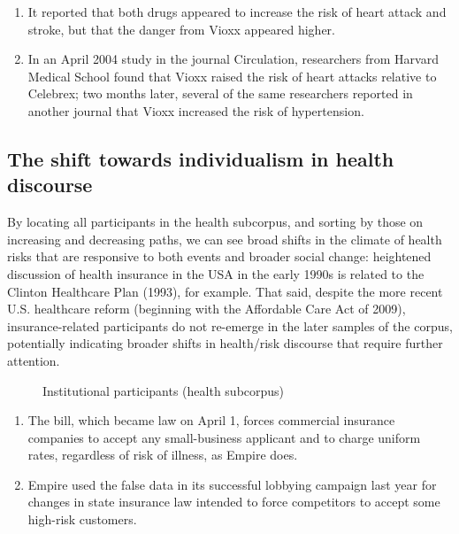 \begin{enumerate} [before=\color{black}\ttfamily] \setlength\itemsep{0em} \small
\item It reported that both drugs appeared to increase the risk of heart attack and stroke, but that the danger from Vioxx appeared higher.
\item In an April 2004 study in the journal Circulation, researchers from Harvard Medical School found that Vioxx raised the risk of heart attacks relative to Celebrex; two months later, several of the same researchers reported in another journal that Vioxx increased the risk of hypertension.
\end{enumerate}

\subsection{The shift towards individualism in health discourse}

By locating all participants in the health subcorpus, and sorting by those on increasing and decreasing paths, we can see broad shifts in the climate of health risks that are responsive to both events and broader social change: heightened discussion of health insurance in the USA in the early 1990s is related to the Clinton Healthcare Plan (1993), for example. That said, despite the more recent U.S. healthcare reform (beginning with the Affordable Care Act of 2009), insurance-related participants do not re-emerge in the later samples of the corpus, potentially indicating broader shifts in health\slash risk discourse that require further attention.

\begin{figure}[htb!]
\centering
{}
\caption{Institutional participants (health subcorpus)}
\end{figure}


\begin{enumerate} [before=\color{black}\ttfamily] \setlength\itemsep{0em} \small
\item The bill, which became law on April 1, forces commercial insurance companies to accept any small-business applicant and to charge uniform rates, regardless of risk of illness, as Empire does.
\item Empire used the false data in its successful lobbying campaign last year for changes in state insurance law intended to force competitors to accept some high-risk customers.
\end{enumerate}

